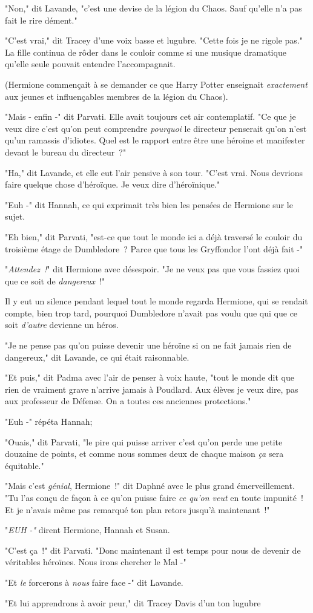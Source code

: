 "Non," dit Lavande, "c'est une devise de la légion du Chaos. Sauf qu'elle n'a pas fait le rire dément."

"C'est vrai," dit Tracey d'une voix basse et lugubre. "Cette fois je ne rigole pas." La fille continua de rôder dans le couloir comme si une musique dramatique qu'elle seule pouvait entendre l'accompagnait.

(Hermione commençait à se demander ce que Harry Potter enseignait \emph{exactement} aux jeunes et influençables membres de la légion du Chaos).

"Mais - enfin -" dit Parvati. Elle avait toujours cet air contemplatif. "Ce que je veux dire c'est qu'on peut comprendre \emph{pourquoi} le directeur penserait qu'on n'est qu'un ramassis d'idiotes. Quel est le rapport entre être une héroïne et manifester devant le bureau du directeur~?"

"Ha," dit Lavande, et elle eut l'air pensive à son tour. "C'est vrai. Nous devrions faire quelque chose d'héroïque. Je veux dire d'héroïnique."

"Euh -" dit Hannah, ce qui exprimait très bien les pensées de Hermione sur le sujet.

"Eh bien," dit Parvati, "est-ce que tout le monde ici a déjà traversé le couloir du troisième étage de Dumbledore~? Parce que tous les Gryffondor l'ont déjà fait -"

"\emph{Attendez~!}" dit Hermione avec désespoir. "Je ne veux pas que vous fassiez quoi que ce soit de \emph{dangereux}~!"

Il y eut un silence pendant lequel tout le monde regarda Hermione, qui se rendait compte, bien trop tard, pourquoi Dumbledore n'avait pas voulu que qui que ce soit \emph{d'autre} devienne un héros.

"Je ne pense pas qu'on puisse devenir une héroïne si on ne fait jamais rien de dangereux," dit Lavande, ce qui était raisonnable.

"Et puis," dit Padma avec l'air de penser à voix haute, "tout le monde dit que rien de vraiment grave n'arrive jamais à Poudlard. Aux élèves je veux dire, pas aux professeur de Défense. On a toutes ces anciennes protections."

"Euh -" répéta Hannah;

"Ouais," dit Parvati, "le pire qui puisse arriver c'est qu'on perde une petite douzaine de points, et comme nous sommes deux de chaque maison \emph{ça} sera équitable."

"Mais c'est \emph{génial}, Hermione~!" dit Daphné avec le plus grand émerveillement. "Tu l'as conçu de façon à ce qu'on puisse faire \emph{ce qu'on veut} en toute impunité~! Et je n'avais même pas remarqué ton plan retors jusqu'à maintenant~!"

"\emph{EUH -"} dirent Hermione, Hannah et Susan.

"C'est ça~!" dit Parvati. "Donc maintenant il est temps pour nous de devenir de véritables héroïnes. Nous irons chercher le Mal -"

"Et \emph{le} forcerons à \emph{nous} faire face -" dit Lavande.

"Et lui apprendrons à avoir peur," dit Tracey Davis d'un ton lugubre 

